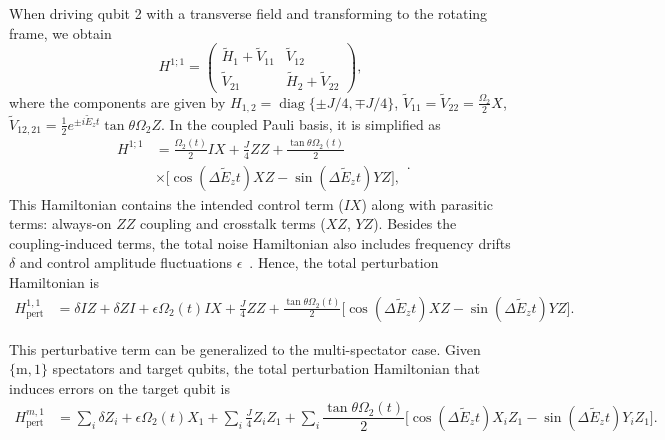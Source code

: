 \documentclass[12pt]{article}
\begin{document}
When driving qubit 2 with a transverse field and transforming to the rotating frame, we obtain 
\begin{equation}
    H^{1;1} = \begin{pmatrix}
        \tilde{H}_1 + \tilde{V}_{11} & \tilde{V}_{12} \\
        \tilde{V}_{21} & \tilde{H}_2 + \tilde{V}_{22}
    \end{pmatrix},
    \label{Eq_2dot_H2_full}
\end{equation}
where the components are given by $H_{1,2}= \operatorname{diag} \{\pm J/4, \mp J/4 \}$, $\tilde{V}_{11} = \tilde{V}_{22} = \frac{\Omega_{2}}{2} X$, $\tilde{V}_{12,21} = \frac{1}{2} e^{\pm i\tilde{E}_z t} \tan \theta \Omega_2 Z$. In the coupled Pauli basis, it is simplified as
\begin{equation}
    \begin{aligned}
        H^{1;1} &= \frac{\Omega_2(t)}{2} IX + \frac{J}{4} ZZ
         + \frac{\tan\theta \Omega_2(t)}{2} \\ 
         & \times
         \Big[\cos(\Delta \tilde{E}_z t) XZ - \sin(\Delta \tilde{E}_z t) YZ \Big],
    \end{aligned}
    \label{Eq_2dot_H_Pauli_supp1}.
\end{equation}
This Hamiltonian contains the intended control term ($IX$) along with parasitic terms: always-on $ZZ$ coupling and crosstalk terms ($XZ$, $YZ$). Besides the coupling-induced terms, the total noise Hamiltonian also includes frequency drifts $\delta$ and control amplitude fluctuations $\epsilon$~\cite{yi2024robust}. Hence, the total perturbation Hamiltonian is
\begin{equation}
    \begin{aligned}
       H^{1,1}_{\text{pert}} &= \delta IZ + \delta ZI + \epsilon\Omega_2(t)IX + \frac{J}{4} ZZ
         + \frac{\tan\theta \Omega_2(t)}{2}
         \Big[\cos(\Delta \tilde{E}_z t) XZ - \sin(\Delta \tilde{E}_z t) YZ \Big].
    \end{aligned}
    \label{Eq_2dot_H_Pauli_supp2}
\end{equation}


This perturbative term can be generalized to the multi-spectator case. Given  $\{\mathrm{m}, \mathrm{1} \}$ spectators and target qubits, the total perturbation Hamiltonian that induces errors on the target qubit is 
\begin{equation}
    \begin{aligned}
        H_{\text{pert}}^{m,1} &=\sum_i \delta Z_i + \epsilon\Omega_2(t)X_1 + \sum_i\frac{J}{4} Z_i Z_1
         + \sum_i\dfrac{\tan\theta \Omega_2(t)}{2}
         \Big[\cos(\Delta \tilde{E}_z t) X_iZ_1 - \sin(\Delta \tilde{E}_z t) Y_iZ_1 \Big].
    \end{aligned}
    \label{Eq_multidot_H_Pauli}
\end{equation}
\end{document}
